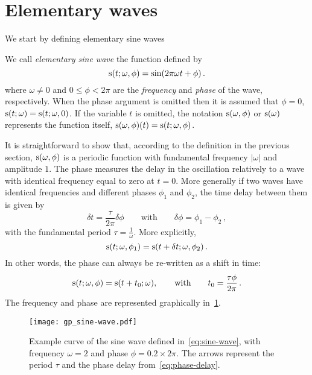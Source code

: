 \section{Elementary waves}
We start by defining elementary sine waves
\begin{definition}
  \label{def:sine-wave}
  We call \emph{elementary sine wave} the function defined by
  \begin{equation}
    \operatorname{s}(t;\omega,\phi)=\sin(2\pi\omega t + \phi)\,.\label{eq:sine-wave}
  \end{equation}
  where $\omega\neq 0$ and $0\leq\phi<2\pi$ are the \emph{frequency} and \emph{phase} of
  the wave, respectively. When the phase argument is omitted then it is assumed that
  $\phi=0$, \ie $\operatorname{s}(t;\omega)=\operatorname{s}(t;\omega,0)$. If the variable $t$ is omitted, the
  notation $\operatorname{s}(\omega,\phi)$ or $\operatorname{s}(\omega)$ represents the function itself, \ie
  $\operatorname{s}(\omega,\phi)(t)=\operatorname{s}(t;\omega,\phi)$.
\end{definition}
It is straightforward to show that, according to the definition in the previous section,
$\operatorname{s}(\omega,\phi)$ is a periodic function with fundamental frequency $|\omega|$ and
amplitude $1$. The phase measures the delay in the oscillation relatively to a wave with
identical frequency equal to zero at $t=0$. More generally if two waves have identical
frequencies and different phases $\phi_1$ and $\phi_2$, the time delay between them is
given by
\begin{equation}
  \delta t =\frac{\tau}{2\pi}\delta\phi\qquad\text{with}\qquad\delta\phi=\phi_1-\phi_2\,,
\end{equation}
with the fundamental period $\tau=\frac{1}{\omega}$. More explicitly,
\begin{equation}
  \operatorname{s}(t;\omega,\phi_1)=\operatorname{s}(t+\delta t;\omega,\phi_2)\,.
\end{equation}
In other words, the phase can always be re-written as a shift in time:
\begin{equation}
  \operatorname{s}(t;\omega,\phi)=\operatorname{s}(t+t_0;\omega),
  \qquad\text{with}\qquad
  t_0 = \frac{\tau\phi}{2\pi}\,.\label{eq:phase-delay}
\end{equation}
The frequency and phase are represented graphically in~\cref{fig:sine-wave}.
\begin{figure}[t]
  \centering
  \texttt{[image: gp\_sine-wave.pdf]}
  \caption{Example curve of the sine wave defined in~\cref{eq:sine-wave}, with frequency
    $\omega=2$ and phase $\phi=0.2\times 2\pi$. The arrows represent the period $\tau$ and
  the phase delay from~\cref{eq:phase-delay}.}
  \label{fig:sine-wave}
\end{figure}
